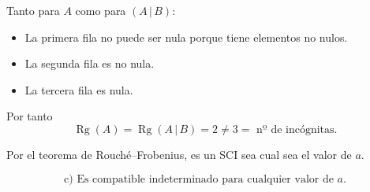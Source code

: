 \documentclass[a4paper,12pt]{article}
\begin{document}
\begin{ejercicio}[title=Ejercicio 29]
Tanto para $A$ como para $(A\,|\,B)$:
\begin{itemize}
    \item La primera fila no puede ser nula porque tiene elementos no nulos.
    \item La segunda fila es no nula.
    \item La tercera fila es nula.
\end{itemize}

Por tanto
\[
\operatorname{Rg}(A)=\operatorname{Rg}(A\,|\,B)=2 \neq 3 = \text{ nº de incógnitas.}
\]

Por el teorema de Rouché–Frobenius, es un SCI sea cual sea el valor de $a$.

\[
\boxed{\text{c) Es compatible indeterminado para cualquier valor de }a.}
\]
\end{ejercicio}
\end{document}
